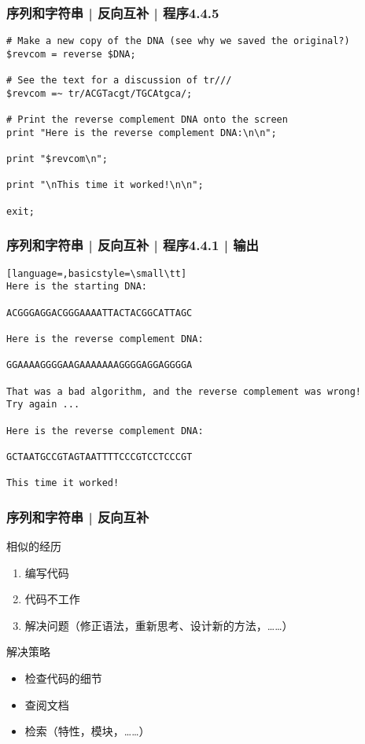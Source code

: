 \begin{frame}[fragile]
  \frametitle{序列和字符串 | 反向互补 | 程序4.4.5}
  \vspace{-1.5em}
\begin{lstlisting}[firstnumber=60,basicstyle=\small\tt]
# Make a new copy of the DNA (see why we saved the original?)
$revcom = reverse $DNA;

# See the text for a discussion of tr///
$revcom =~ tr/ACGTacgt/TGCAtgca/;

# Print the reverse complement DNA onto the screen
print "Here is the reverse complement DNA:\n\n";

print "$revcom\n";

print "\nThis time it worked!\n\n";

exit;
\end{lstlisting}
\end{frame}

\begin{frame}[fragile]
  \frametitle{序列和字符串 | 反向互补 | 程序4.4.1 | 输出}
  \vspace{-1.5em}
\begin{lstlisting}[language=,basicstyle=\small\tt]
Here is the starting DNA:

ACGGGAGGACGGGAAAATTACTACGGCATTAGC

Here is the reverse complement DNA:

GGAAAAGGGGAAGAAAAAAAGGGGAGGAGGGGA

That was a bad algorithm, and the reverse complement was wrong!
Try again ...

Here is the reverse complement DNA:

GCTAATGCCGTAGTAATTTTCCCGTCCTCCCGT

This time it worked!
\end{lstlisting}
\end{frame}

\begin{frame}
  \frametitle{序列和字符串 | 反向互补}
   \begin{block}{相似的经历}
     \begin{enumerate}
       \item 编写代码
       \item 代码不工作
       \item 解决问题（修正语法，重新思考、设计新的方法，……）
     \end{enumerate}
   \end{block} 
   \pause
   \begin{block}{解决策略}
     \begin{itemize}
       \item 检查代码的细节
       \item 查阅文档
       \item 检索（特性，模块，……）
     \end{itemize}
   \end{block}
\end{frame}

